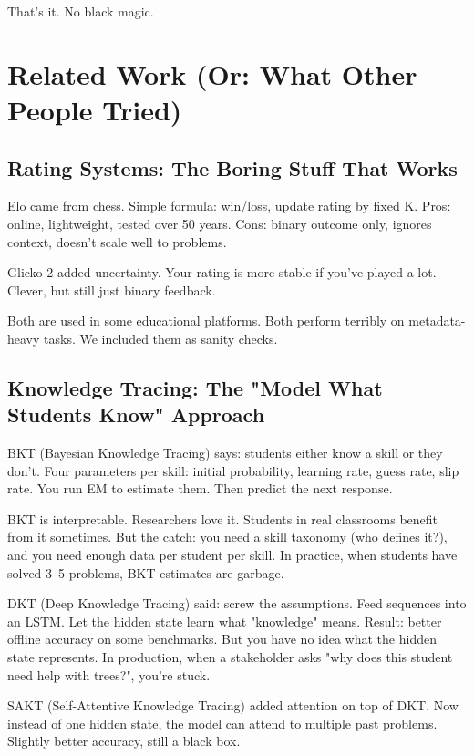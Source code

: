 \documentclass[conference]{IEEEtran}
\begin{document}
That's it. No black magic.

\section{Related Work (Or: What Other People Tried)}

\subsection{Rating Systems: The Boring Stuff That Works}

Elo came from chess. Simple formula: win/loss, update rating by fixed K. Pros: online, lightweight, tested over 50 years. Cons: binary outcome only, ignores context, doesn't scale well to problems.

Glicko-2 added uncertainty. Your rating is more stable if you've played a lot. Clever, but still just binary feedback.

Both are used in some educational platforms. Both perform terribly on metadata-heavy tasks. We included them as sanity checks.

\subsection{Knowledge Tracing: The "Model What Students Know" Approach}

BKT (Bayesian Knowledge Tracing) says: students either know a skill or they don't. Four parameters per skill: initial probability, learning rate, guess rate, slip rate. You run EM to estimate them. Then predict the next response.

BKT is interpretable. Researchers love it. Students in real classrooms benefit from it sometimes. But the catch: you need a skill taxonomy (who defines it?), and you need enough data per student per skill. In practice, when students have solved 3--5 problems, BKT estimates are garbage.

DKT (Deep Knowledge Tracing) said: screw the assumptions. Feed sequences into an LSTM. Let the hidden state learn what "knowledge" means. Result: better offline accuracy on some benchmarks. But you have no idea what the hidden state represents. In production, when a stakeholder asks "why does this student need help with trees?", you're stuck.

SAKT (Self-Attentive Knowledge Tracing) added attention on top of DKT. Now instead of one hidden state, the model can attend to multiple past problems. Slightly better accuracy, still a black box.
\end{document}
